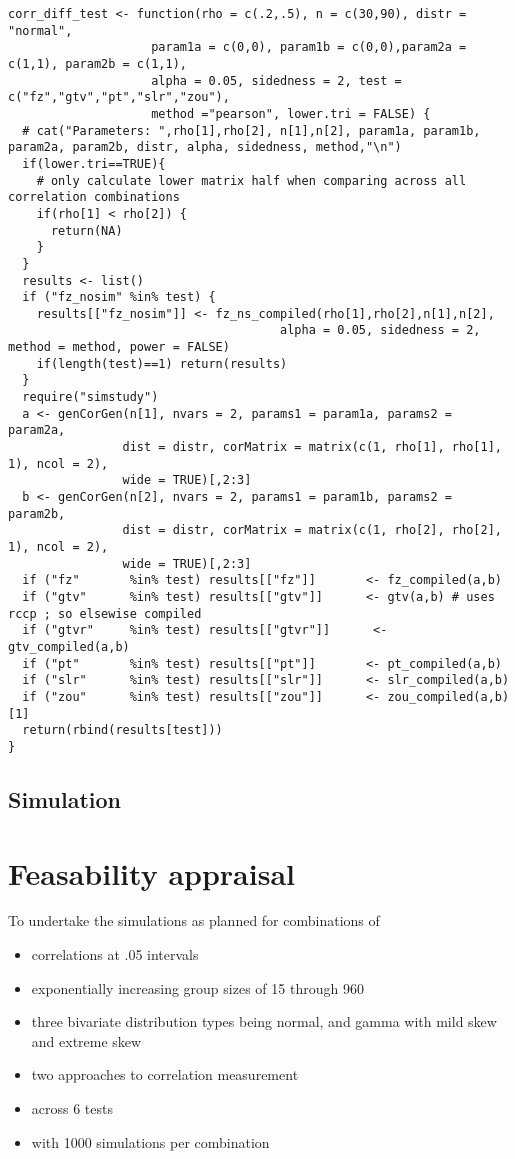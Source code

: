 \begin{lstlisting}[caption={Single run simulation code}]
corr_diff_test <- function(rho = c(.2,.5), n = c(30,90), distr = "normal",
                    param1a = c(0,0), param1b = c(0,0),param2a = c(1,1), param2b = c(1,1),
                    alpha = 0.05, sidedness = 2, test = c("fz","gtv","pt","slr","zou"),
                    method ="pearson", lower.tri = FALSE) {
  # cat("Parameters: ",rho[1],rho[2], n[1],n[2], param1a, param1b, param2a, param2b, distr, alpha, sidedness, method,"\n")
  if(lower.tri==TRUE){
    # only calculate lower matrix half when comparing across all correlation combinations
    if(rho[1] < rho[2]) { 
      return(NA)
    }
  }
  results <- list()
  if ("fz_nosim" %in% test) {
    results[["fz_nosim"]] <- fz_ns_compiled(rho[1],rho[2],n[1],n[2], 
                                      alpha = 0.05, sidedness = 2, method = method, power = FALSE)
    if(length(test)==1) return(results)
  }
  require("simstudy")
  a <- genCorGen(n[1], nvars = 2, params1 = param1a, params2 = param2a,  
                dist = distr, corMatrix = matrix(c(1, rho[1], rho[1], 1), ncol = 2), 
                wide = TRUE)[,2:3]
  b <- genCorGen(n[2], nvars = 2, params1 = param1b, params2 = param2b,  
                dist = distr, corMatrix = matrix(c(1, rho[2], rho[2], 1), ncol = 2), 
                wide = TRUE)[,2:3]
  if ("fz"       %in% test) results[["fz"]]       <- fz_compiled(a,b)
  if ("gtv"      %in% test) results[["gtv"]]      <- gtv(a,b) # uses rccp ; so elsewise compiled
  if ("gtvr"     %in% test) results[["gtvr"]]      <- gtv_compiled(a,b) 
  if ("pt"       %in% test) results[["pt"]]       <- pt_compiled(a,b)
  if ("slr"      %in% test) results[["slr"]]      <- slr_compiled(a,b)
  if ("zou"      %in% test) results[["zou"]]      <- zou_compiled(a,b)[1]
  return(rbind(results[test]))
}
\end{lstlisting}

\subsection{Simulation}


  
\section{Feasability appraisal}
To undertake the simulations as planned for combinations of 
\begin{itemize}
  \item correlations at .05 intervals 
  \item exponentially increasing group sizes of 15 through 960
  \item three bivariate distribution types being normal, and gamma with mild skew and extreme skew
  \item two approaches to correlation measurement 
  \item across 6 tests
  \item with 1000 simulations per combination 
\end{itemize}

